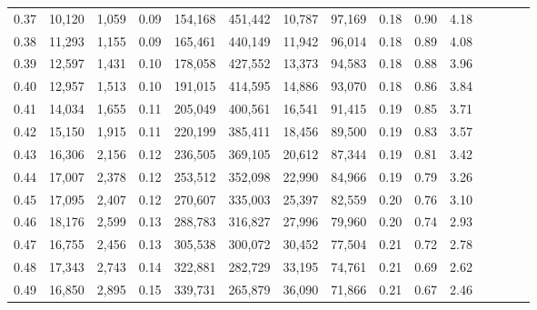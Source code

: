 \begin{tabular}{rrrcrrrrrrrrrrr}
0.37 &  10,120 &  1,059 &                                       0.09 &  154,168 &  451,442 &   10,787 &   97,169 &  0.18 &  0.90 &                         4.18 \\
0.38 &  11,293 &  1,155 &                                       0.09 &  165,461 &  440,149 &   11,942 &   96,014 &  0.18 &  0.89 &                         4.08 \\
0.39 &  12,597 &  1,431 &                                       0.10 &  178,058 &  427,552 &   13,373 &   94,583 &  0.18 &  0.88 &                         3.96 \\
0.40 &  12,957 &  1,513 &                                       0.10 &  191,015 &  414,595 &   14,886 &   93,070 &  0.18 &  0.86 &                         3.84 \\
0.41 &  14,034 &  1,655 &                                       0.11 &  205,049 &  400,561 &   16,541 &   91,415 &  0.19 &  0.85 &                         3.71 \\
0.42 &  15,150 &  1,915 &                                       0.11 &  220,199 &  385,411 &   18,456 &   89,500 &  0.19 &  0.83 &                         3.57 \\
0.43 &  16,306 &  2,156 &                                       0.12 &  236,505 &  369,105 &   20,612 &   87,344 &  0.19 &  0.81 &                         3.42 \\
0.44 &  17,007 &  2,378 &                                       0.12 &  253,512 &  352,098 &   22,990 &   84,966 &  0.19 &  0.79 &                         3.26 \\
0.45 &  17,095 &  2,407 &                                       0.12 &  270,607 &  335,003 &   25,397 &   82,559 &  0.20 &  0.76 &                         3.10 \\
0.46 &  18,176 &  2,599 &                                       0.13 &  288,783 &  316,827 &   27,996 &   79,960 &  0.20 &  0.74 &                         2.93 \\
0.47 &  16,755 &  2,456 &                                       0.13 &  305,538 &  300,072 &   30,452 &   77,504 &  0.21 &  0.72 &                         2.78 \\
0.48 &  17,343 &  2,743 &                                       0.14 &  322,881 &  282,729 &   33,195 &   74,761 &  0.21 &  0.69 &                         2.62 \\
0.49 &  16,850 &  2,895 &                                       0.15 &  339,731 &  265,879 &   36,090 &   71,866 &  0.21 &  0.67 &                         2.46 \\

\end{tabular}
